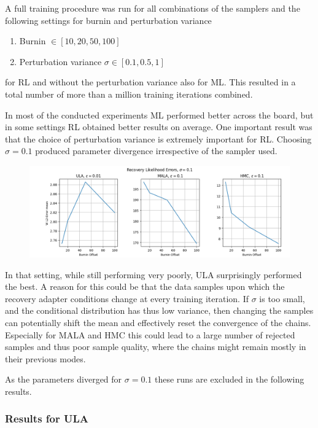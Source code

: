 A full training procedure was run for all combinations of the samplers and the following settings for burnin and perturbation variance
\begin{enumerate}
	\item Burnin $\in [10, 20, 50, 100]$
	\item Perturbation variance $\sigma \in [0.1, 0.5, 1]$
\end{enumerate}

for RL and without the perturbation variance also for ML. This resulted in a total number of more than a million training iterations combined.

In most of the conducted experiments ML performed better across the board, but in some settings RL obtained better results on average.
One important result was that the choice of perturbation variance is extremely important for RL.
Choosing $\sigma = 0.1$ produced parameter divergence irrespective of the sampler used.
\begin{figure}[H]
  	\centering
  	\includegraphics[width=0.85\linewidth]{assets/figures/low_sigma_recov.png}
\end{figure}

In that setting, while still performing very poorly, ULA surprisingly performed the best. 
A reason for this could be that the data samples upon which the recovery adapter conditions change at every training iteration.
If $\sigma$ is too small, and the conditional distribution has thus low variance, then changing the samples can potentially shift the mean 
and effectively reset the convergence of the chains. 
Especially for MALA and HMC this could lead to a large number of rejected samples and thus poor sample quality, 
where the chains might remain mostly in their previous modes.

As the parameters diverged for $\sigma = 0.1$ these runs are excluded in the following results.


\subsubsection{Results for ULA}

